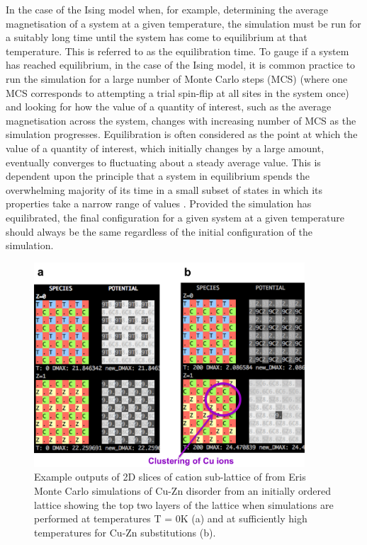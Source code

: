 \documentclass[11pt, twoside]{report}
\begin{document}
In the case of the Ising model when, for example, determining the average magnetisation of a system at a given temperature, the simulation must be run for a suitably long time until the system has come to equilibrium at that temperature. This is referred to as the equilibration time. 
To gauge if a system has reached equilibrium, in the case of the Ising model, it is common practice to run the simulation for a large number of Monte Carlo steps (MCS) (where one MCS corresponds to attempting a trial spin-flip at all sites in the system once) and looking for how the value of a quantity of interest, such as the average magnetisation across the system, changes with increasing number of MCS as the simulation progresses. Equilibration is often considered as the point at which the value of a quantity of interest, which initially changes by a large amount, eventually converges to fluctuating about a steady average value. 
This is dependent upon the principle that a system in equilibrium spends the overwhelming majority of its time in a small subset of states in which its properties take a narrow range of values \cite{MC}. Provided the simulation has equilibrated, the final configuration for a given system at a given temperature should always be the same regardless of the initial configuration of the simulation.

\begin{figure}[h!]
  \centering
    \includegraphics[width=0.9\textwidth]{figures/eris_spatial_disorder.png}
    \caption{Example outputs of 2D slices of cation sub-lattice of {\CZTS} from Eris Monte Carlo simulations of Cu-Zn disorder from an initially ordered lattice showing the top two layers of the lattice when simulations are performed at temperatures T = 0K (a) and at sufficiently high temperatures for Cu-Zn substitutions (b).}
  \label{eris_spatial_disorder}
\end{figure}
\end{document}
